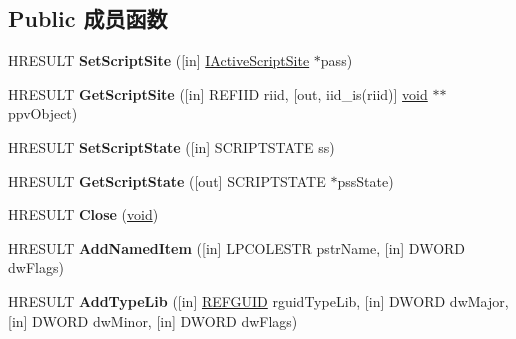 \subsection*{Public 成员函数}
\begin{DoxyCompactItemize}
\item 
\mbox{\label{interface_i_active_script_adcb5b1b1b8bc456c51202b4c8c5e233a}} 
H\+R\+E\+S\+U\+LT {\bfseries Set\+Script\+Site} (\mbox{[}in\mbox{]} \hyperlink{interface_i_active_script_site}{I\+Active\+Script\+Site} $\ast$pass)
\item 
\mbox{\label{interface_i_active_script_a570f1bbbef05823d9430664bf46b6f5d}} 
H\+R\+E\+S\+U\+LT {\bfseries Get\+Script\+Site} (\mbox{[}in\mbox{]} R\+E\+F\+I\+ID riid, \mbox{[}out, iid\+\_\+is(riid)\mbox{]} \hyperlink{interfacevoid}{void} $\ast$$\ast$ppv\+Object)
\item 
\mbox{\label{interface_i_active_script_abf24cb578d3294449e5146c018daf16e}} 
H\+R\+E\+S\+U\+LT {\bfseries Set\+Script\+State} (\mbox{[}in\mbox{]} S\+C\+R\+I\+P\+T\+S\+T\+A\+TE ss)
\item 
\mbox{\label{interface_i_active_script_a5eb1c9b9e9033a5e94bfafdf0691c5ac}} 
H\+R\+E\+S\+U\+LT {\bfseries Get\+Script\+State} (\mbox{[}out\mbox{]} S\+C\+R\+I\+P\+T\+S\+T\+A\+TE $\ast$pss\+State)
\item 
\mbox{\label{interface_i_active_script_aad5c865020ed5bb7b999228a7738371e}} 
H\+R\+E\+S\+U\+LT {\bfseries Close} (\hyperlink{interfacevoid}{void})
\item 
\mbox{\label{interface_i_active_script_ab3b8fa89f7730a66c141878694516b34}} 
H\+R\+E\+S\+U\+LT {\bfseries Add\+Named\+Item} (\mbox{[}in\mbox{]} L\+P\+C\+O\+L\+E\+S\+TR pstr\+Name, \mbox{[}in\mbox{]} D\+W\+O\+RD dw\+Flags)
\item 
\mbox{\label{interface_i_active_script_a54b6338cfcddf297dbf243c77dc96eb5}} 
H\+R\+E\+S\+U\+LT {\bfseries Add\+Type\+Lib} (\mbox{[}in\mbox{]} \hyperlink{struct___g_u_i_d}{R\+E\+F\+G\+U\+ID} rguid\+Type\+Lib, \mbox{[}in\mbox{]} D\+W\+O\+RD dw\+Major, \mbox{[}in\mbox{]} D\+W\+O\+RD dw\+Minor, \mbox{[}in\mbox{]} D\+W\+O\+RD dw\+Flags)
$$
\end{DoxyCompactItemize}
